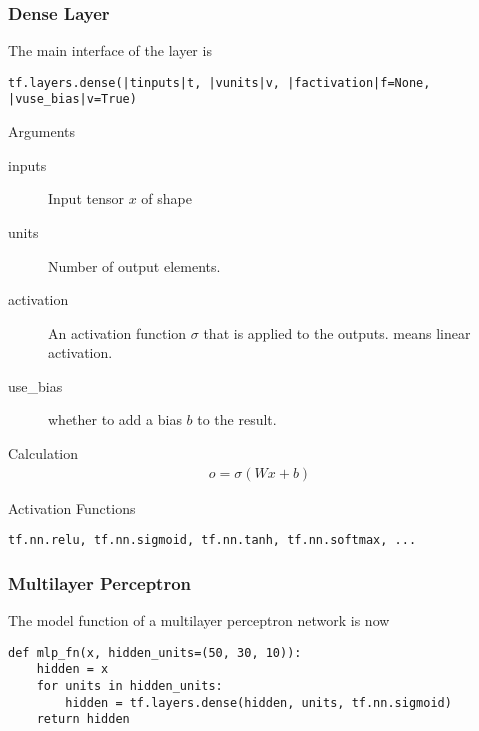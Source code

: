 \begin{frame}[fragile]
    \frametitle{Dense Layer}
    The main interface of the layer is
    \begin{lstlisting}
tf.layers.dense(|tinputs|t, |vunits|v, |factivation|f=None, |vuse_bias|v=True)
    \end{lstlisting}
    \begin{block}{Arguments}
        \begin{description}
        \item[inputs] Input tensor $x$ of shape  
        \item[units] Number of output elements.
        \item[activation] An activation function $\sigma$ that is applied to the outputs.  means linear activation.
        \item[use\_bias] whether to add a bias $b$ to the result. 
        \end{description}
    \end{block}
    \begin{block}{Calculation}
    \vspace{-4ex}
    \begin{align}
        o = \sigma(Wx+b)
    \end{align}
    \end{block}
    \begin{block}{Activation Functions}
    \begin{lstlisting}
tf.nn.relu, tf.nn.sigmoid, tf.nn.tanh, tf.nn.softmax, ...
    \end{lstlisting}
    \end{block}
\end{frame}

\begin{frame}[fragile]
    \frametitle{Multilayer Perceptron}
    The model function of a multilayer perceptron network is now
    \begin{lstlisting}
def mlp_fn(x, hidden_units=(50, 30, 10)):
    hidden = x
    for units in hidden_units:
        hidden = tf.layers.dense(hidden, units, tf.nn.sigmoid)
    return hidden
    \end{lstlisting}
\end{frame}


